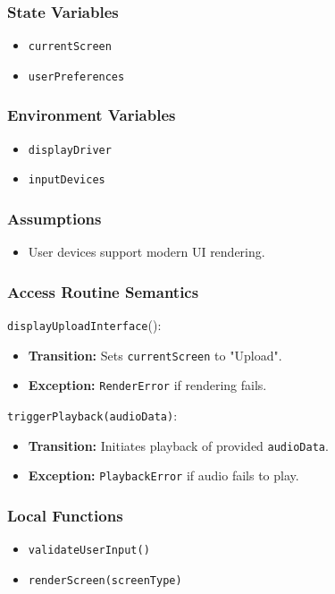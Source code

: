 \documentclass[12pt, titlepage]{article}
\begin{document}
\subsubsection{State Variables}  
\begin{itemize}  
    \item \texttt{currentScreen}  
    \item \texttt{userPreferences}  
\end{itemize}  

\subsubsection{Environment Variables}  
\begin{itemize}  
    \item \texttt{displayDriver}  
    \item \texttt{inputDevices}  
\end{itemize}  

\subsubsection{Assumptions}  
\begin{itemize}  
    \item User devices support modern UI rendering.  
\end{itemize}  

\subsubsection{Access Routine Semantics}  

\noindent \texttt{displayUploadInterface}():
\begin{itemize}  
    \item \textbf{Transition:} Sets \texttt{currentScreen} to "Upload".  
    \item \textbf{Exception:} \texttt{RenderError} if rendering fails.  
\end{itemize}  

\noindent \texttt{triggerPlayback(audioData)}:
\begin{itemize}  
    \item \textbf{Transition:} Initiates playback of provided \texttt{audioData}.  
    \item \textbf{Exception:} \texttt{PlaybackError} if audio fails to play.  
\end{itemize}  

\subsubsection{Local Functions}  
\begin{itemize}  
    \item \texttt{validateUserInput()}  
    \item \texttt{renderScreen(screenType)}  
\end{itemize}  
\end{document}
